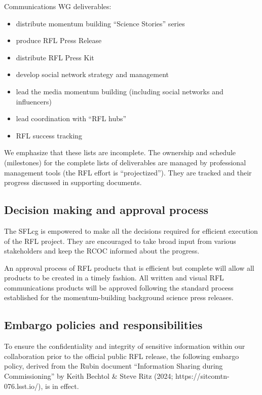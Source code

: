Communications WG deliverables:
\begin{itemize}
\item distribute momentum building “Science Stories” series
\item produce RFL Press Release
\item distribute RFL Press Kit 
\item develop social network strategy and management
\item lead the media momentum building (including social networks and influencers)
\item lead coordination with ``RFL hubs''  
\item RFL success tracking 
\end{itemize} 

We emphasize that these lists are incomplete. The ownership and schedule (milestones) for the complete
lists of deliverables are managed by professional management
tools (the RFL effort is ``projectized''). They are tracked and their progress discussed in supporting documents. 


\subsection{Decision making and approval process} 

The SFLcg is empowered to make all the decisions required for efficient execution of the RFL project.
They are encouraged to take broad input from various stakeholders and keep the RCOC informed about
the progress. 

An approval process of RFL products that is efficient but complete will allow all products to be created in a
timely fashion. All written and visual RFL communications products will be approved following the standard
process established for the momentum-building background science press releases. 


\subsection{Embargo policies and responsibilities \label{embargo}}

To ensure the confidentiality and integrity of sensitive information within our collaboration prior to the official
public RFL release, the following embargo policy, derived from the Rubin document ``Information Sharing during
Commissioning'' by Keith Bechtol \& Steve Ritz (2024; https://sitcomtn-076.lsst.io/), is in effect. 

